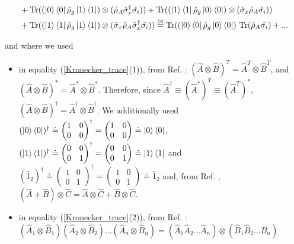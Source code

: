 \documentclass[11pt]{article}
\numberwithin{equation}{section} %
\numberwithin{figure}{section} %
\newcommand\numeq[1] %
  {\stackrel{\scriptscriptstyle(\mkern-1.5mu#1\mkern-1.5mu)}{=}}
\begin{document}
\begin{equation}
\begin{split}
&+\textrm{Tr}((\ket{0}\bra{0}\hat{\rho}_g\ket{1}\bra{1})\otimes(\hat{\rho}_A\hat{\sigma}_x^\dagger\hat{\sigma_i}))+\textrm{Tr}((\ket{1}\bra{1}\hat{\rho}_g\ket{0}\bra{0})\otimes(\hat{\sigma}_x \hat{\rho}_A\hat{\sigma_i}))\\
&+\textrm{Tr}((\ket{1}\bra{1}\hat{\rho}_g\ket{1}\bra{1})\otimes(\hat{\sigma}_x \hat{\rho}_A \hat{\sigma}_x^\dagger\hat{\sigma_i}))\numeq{3}\textrm{Tr}((\ket{0}\bra{0}\hat{\rho}_g\ket{0}\bra{0})\,\,\textrm{Tr}(\hat{\rho}_A\hat{\sigma_i})+...\\
\end{split}
\end{equation}




and where we used
\begin{itemize}
\item in equality (\ref{Kronecker_trace}(1)), from Ref. \cite[p.~243, 4.2.4-5]{Trace}: $(\hat{A}\otimes\hat{B})^T=\hat{A}^T\otimes\hat{B}^T$, and $(\hat{A}\otimes\hat{B})^*=\hat{A}^*\otimes\hat{B}^*$. Therefore, since $\hat{A}^\dagger\equiv(\hat{A}^*)^T\equiv(\hat{A}^T)^*$, $(\hat{A}\otimes\hat{B})^\dagger=\hat{A}^\dagger\otimes\hat{B}^\dagger$. We additionally used $(\ket{0}\bra{0})^\dagger\doteq\begin{pmatrix}1&0\\0&0\end{pmatrix}^\dagger=\begin{pmatrix}1&0\\0&0\end{pmatrix}\doteq\ket{0}\bra{0}$, $(\ket{1}\bra{1})^\dagger\doteq\begin{pmatrix}0&0\\0&1\end{pmatrix}^\dagger=\begin{pmatrix}0&0\\0&1\end{pmatrix}\doteq\ket{1}\bra{1}$ and $(\hat{1}_2)^\dagger\doteq\begin{pmatrix}1&0\\0&1\end{pmatrix}^\dagger=\begin{pmatrix}1&0\\0&1\end{pmatrix}\doteq\hat{1}_2$ and, from Ref. \cite[p.~243, 4.2.7]{Trace}, $(\hat{A}+\hat{B})\otimes\hat{C}=\hat{A}\otimes\hat{C}+\hat{B}\otimes\hat{C}$.
\item in equality (\ref{Kronecker_trace}(2)), from Ref. \cite[p.~251, ex.~4.2.14]{Trace}: $(\hat{A}_1\otimes\hat{B}_1)(\hat{A}_2\otimes\hat{B}_2)...(\hat{A}_n\otimes\hat{B}_n)=(\hat{A}_1\hat{A}_2...\hat{A}_n)\otimes(\hat{B}_1\hat{B}_2...\hat{B}_n)$ %

\end{itemize}
\end{document}

